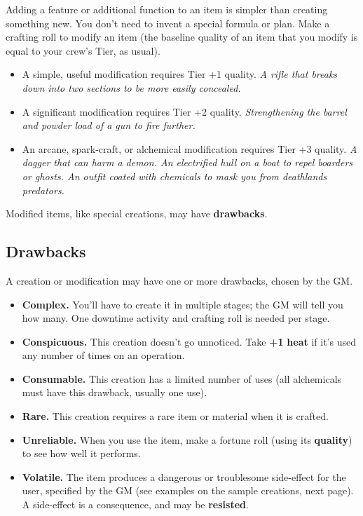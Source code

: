 \documentclass[11pt,fleqn,a5paper]{book}
\newcommand{\gameterm}[1]{\textbf{#1}}
\begin{document}
Adding a feature or additional function to an item is simpler than creating something new. You don’t need to invent a special formula or plan. Make a crafting roll to modify an item (the baseline quality of an item that you modify is equal to your crew’s Tier, as usual).

\begin{itemize}
	\item A simple, useful modification requires Tier +1 quality. \emph{A rifle that breaks down into two sections to be more easily concealed.}
	\item A significant modification requires Tier +2 quality. \emph{Strengthening the barrel and powder load of a gun to fire further.}
	\item An arcane, spark-craft, or alchemical modification requires Tier +3 quality. \emph{A dagger that can harm a demon. An electrified hull on a boat to repel boarders or ghosts. An outfit coated with chemicals to mask you from deathlands predators.}
\end{itemize}

Modified items, like special creations, may have \textbf{drawbacks}.

\subsection{Drawbacks}

A creation or modification may have one or more drawbacks, chosen by the GM.

\begin{itemize}
	\item \gameterm{Complex. } You’ll have to create it in multiple stages; the GM will tell you how many. One downtime activity and crafting roll is needed per stage.
	\item \gameterm{Conspicuous. } This creation doesn’t go unnoticed. Take \textbf{+1} \gameterm{heat}  if it’s used any number of times on an operation.
	\item \gameterm{Consumable.}  This creation has a limited number of uses (all alchemicals must have this drawback, usually one use).
	\item \gameterm{Rare. } This creation requires a rare item or material when it is crafted.
	\item \gameterm{Unreliable. } When you use the item, make a fortune roll (using its \textbf{quality}) to see how well it performs.
	\item \gameterm{Volatile. } The item produces a dangerous or troublesome side-effect for the user, specified by the GM (see examples on the sample creations, next page). A side-effect is a consequence, and may be \textbf{resisted}.
\end{itemize}
\end{document}
